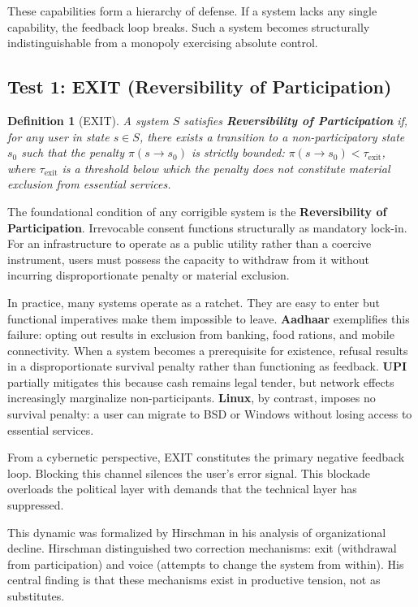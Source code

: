\documentclass{article}
\newtheorem{definition}{Definition}
\begin{document}
These capabilities form a hierarchy of defense. If a system lacks any single capability, the feedback loop breaks. Such a system becomes structurally indistinguishable from a monopoly exercising absolute control.

\subsection{Test 1: EXIT (Reversibility of Participation)}

\begin{definition}[EXIT]
\label{def:exit}
A system $S$ satisfies \textbf{Reversibility of Participation} if, for any user in state $s \in S$, there exists a transition to a non-participatory state $s_0$ such that the penalty $\pi(s \to s_0)$ is strictly bounded: $\pi(s \to s_0) < \tau_{\text{exit}}$, where $\tau_{\text{exit}}$ is a threshold below which the penalty does not constitute material exclusion from essential services.
\end{definition}

The foundational condition of any corrigible system is the \textbf{Reversibility of Participation}. Irrevocable consent functions structurally as mandatory lock-in. For an infrastructure to operate as a public utility rather than a coercive instrument, users must possess the capacity to withdraw from it without incurring disproportionate penalty or material exclusion.

In practice, many systems operate as a ratchet. They are easy to enter but functional imperatives make them impossible to leave. \textbf{Aadhaar} exemplifies this failure: opting out results in exclusion from banking, food rations, and mobile connectivity. When a system becomes a prerequisite for existence, refusal results in a disproportionate survival penalty rather than functioning as feedback. \textbf{UPI} partially mitigates this because cash remains legal tender, but network effects increasingly marginalize non-participants. \textbf{Linux}, by contrast, imposes no survival penalty: a user can migrate to BSD or Windows without losing access to essential services.

From a cybernetic perspective, EXIT constitutes the primary negative feedback loop. Blocking this channel silences the user's error signal. This blockade overloads the political layer with demands that the technical layer has suppressed.

This dynamic was formalized by Hirschman \citep{hirschman1970} in his analysis of organizational decline. Hirschman distinguished two correction mechanisms: exit (withdrawal from participation) and voice (attempts to change the system from within). His central finding is that these mechanisms exist in productive tension, not as substitutes.
\end{document}
